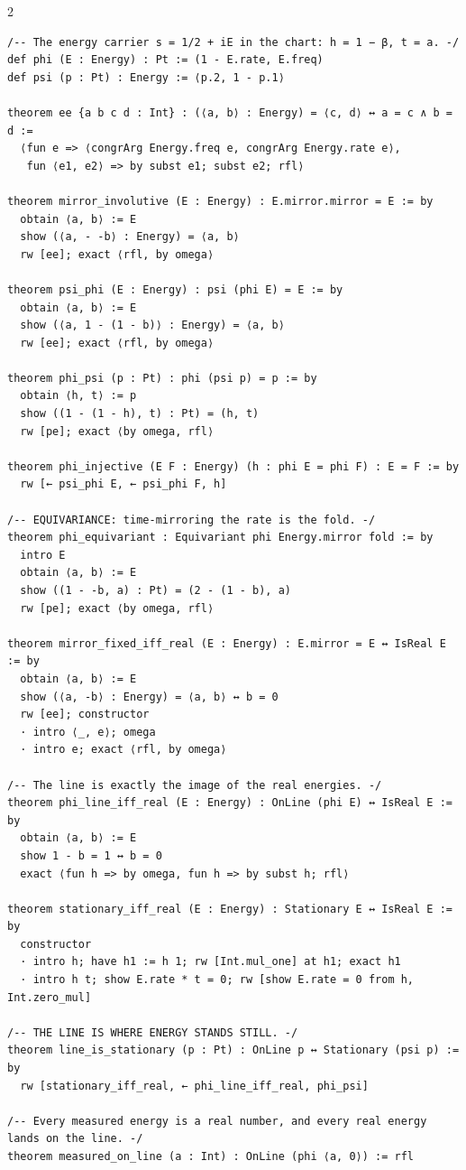\documentclass[10pt]{article}
\begin{document}
\begin{multicols}{2}
\begin{Verbatim}[fontsize=\fontsize{6.0}{6.9}\selectfont,breaklines,breakanywhere,breaksymbolleft={}]
/-- The energy carrier s = 1/2 + iE in the chart: h = 1 − β, t = a. -/
def phi (E : Energy) : Pt := (1 - E.rate, E.freq)
def psi (p : Pt) : Energy := ⟨p.2, 1 - p.1⟩

theorem ee {a b c d : Int} : (⟨a, b⟩ : Energy) = ⟨c, d⟩ ↔ a = c ∧ b = d :=
  ⟨fun e => ⟨congrArg Energy.freq e, congrArg Energy.rate e⟩,
   fun ⟨e1, e2⟩ => by subst e1; subst e2; rfl⟩

theorem mirror_involutive (E : Energy) : E.mirror.mirror = E := by
  obtain ⟨a, b⟩ := E
  show (⟨a, - -b⟩ : Energy) = ⟨a, b⟩
  rw [ee]; exact ⟨rfl, by omega⟩

theorem psi_phi (E : Energy) : psi (phi E) = E := by
  obtain ⟨a, b⟩ := E
  show (⟨a, 1 - (1 - b)⟩ : Energy) = ⟨a, b⟩
  rw [ee]; exact ⟨rfl, by omega⟩

theorem phi_psi (p : Pt) : phi (psi p) = p := by
  obtain ⟨h, t⟩ := p
  show ((1 - (1 - h), t) : Pt) = (h, t)
  rw [pe]; exact ⟨by omega, rfl⟩

theorem phi_injective (E F : Energy) (h : phi E = phi F) : E = F := by
  rw [← psi_phi E, ← psi_phi F, h]

/-- EQUIVARIANCE: time-mirroring the rate is the fold. -/
theorem phi_equivariant : Equivariant phi Energy.mirror fold := by
  intro E
  obtain ⟨a, b⟩ := E
  show ((1 - -b, a) : Pt) = (2 - (1 - b), a)
  rw [pe]; exact ⟨by omega, rfl⟩

theorem mirror_fixed_iff_real (E : Energy) : E.mirror = E ↔ IsReal E := by
  obtain ⟨a, b⟩ := E
  show (⟨a, -b⟩ : Energy) = ⟨a, b⟩ ↔ b = 0
  rw [ee]; constructor
  · intro ⟨_, e⟩; omega
  · intro e; exact ⟨rfl, by omega⟩

/-- The line is exactly the image of the real energies. -/
theorem phi_line_iff_real (E : Energy) : OnLine (phi E) ↔ IsReal E := by
  obtain ⟨a, b⟩ := E
  show 1 - b = 1 ↔ b = 0
  exact ⟨fun h => by omega, fun h => by subst h; rfl⟩

theorem stationary_iff_real (E : Energy) : Stationary E ↔ IsReal E := by
  constructor
  · intro h; have h1 := h 1; rw [Int.mul_one] at h1; exact h1
  · intro h t; show E.rate * t = 0; rw [show E.rate = 0 from h, Int.zero_mul]

/-- THE LINE IS WHERE ENERGY STANDS STILL. -/
theorem line_is_stationary (p : Pt) : OnLine p ↔ Stationary (psi p) := by
  rw [stationary_iff_real, ← phi_line_iff_real, phi_psi]

/-- Every measured energy is a real number, and every real energy lands on the line. -/
theorem measured_on_line (a : Int) : OnLine (phi ⟨a, 0⟩) := rfl


\end{Verbatim}
\end{multicols}
\end{document}
